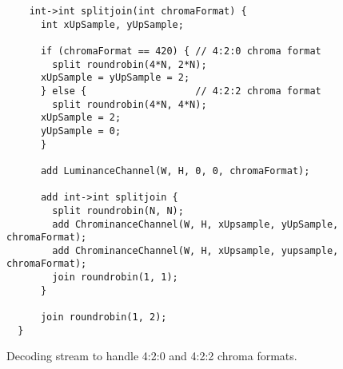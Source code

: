 \begin{figure*}[t]
  \begin{scriptsize}
    \begin{verbatim}
    int->int splitjoin(int chromaFormat) {
      int xUpSample, yUpSample;

      if (chromaFormat == 420) { // 4:2:0 chroma format
        split roundrobin(4*N, 2*N);
	  xUpSample = yUpSample = 2;
      } else {                   // 4:2:2 chroma format
        split roundrobin(4*N, 4*N);
	  xUpSample = 2;
	  yUpSample = 0;
      }

      add LuminanceChannel(W, H, 0, 0, chromaFormat);

      add int->int splitjoin {
        split roundrobin(N, N);
        add ChrominanceChannel(W, H, xUpsample, yUpSample, chromaFormat);
        add ChrominanceChannel(W, H, xUpsample, yupsample, chromaFormat);
        join roundrobin(1, 1);
      }

      join roundrobin(1, 2);
  }
  \end{verbatim}
  \end{scriptsize}
  \caption{Decoding stream to handle 4:2:0 and 4:2:2 chroma formats.}
  \label{fig:chroma-stream}
\end{figure*}
